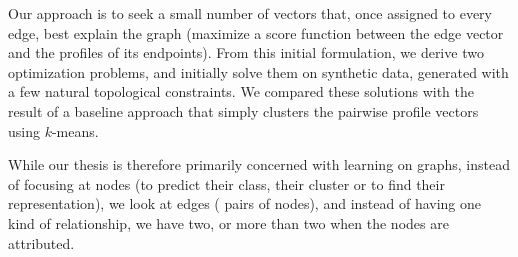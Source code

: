Our approach is to seek a small number of vectors that, once assigned to every edge, best explain
the graph (\ie maximize a score function between the edge vector and the profiles of its endpoints).
From this initial formulation, we derive two optimization problems, and initially solve them on
synthetic data, generated with a few natural topological constraints. We compared these solutions
with the result of a baseline approach that simply clusters the pairwise profile vectors using
$k$-means.


While our thesis is therefore primarily concerned with learning on graphs, instead of focusing at
nodes (to predict their class, their cluster or to find their representation), we look at edges (\ie
pairs of nodes), and instead of having one kind of relationship, we have two, or more than two when
the nodes are attributed.
